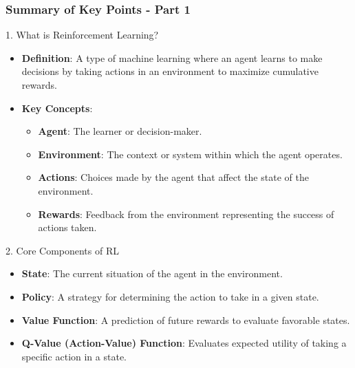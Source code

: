 \documentclass[aspectratio=169]{beamer}
\begin{document}
\begin{frame}[fragile]
    \frametitle{Summary of Key Points - Part 1}
    \begin{block}{1. What is Reinforcement Learning?}
        \begin{itemize}
            \item \textbf{Definition}: A type of machine learning where an agent learns to make decisions by taking actions in an environment to maximize cumulative rewards.
            \item \textbf{Key Concepts}:
            \begin{itemize}
                \item \textbf{Agent}: The learner or decision-maker.
                \item \textbf{Environment}: The context or system within which the agent operates.
                \item \textbf{Actions}: Choices made by the agent that affect the state of the environment.
                \item \textbf{Rewards}: Feedback from the environment representing the success of actions taken.
            \end{itemize}
        \end{itemize}
    \end{block}
    
    \begin{block}{2. Core Components of RL}
        \begin{itemize}
            \item \textbf{State}: The current situation of the agent in the environment.
            \item \textbf{Policy}: A strategy for determining the action to take in a given state.
            \item \textbf{Value Function}: A prediction of future rewards to evaluate favorable states.
            \item \textbf{Q-Value (Action-Value) Function}: Evaluates expected utility of taking a specific action in a state.
        \end{itemize}
    \end{block}
\end{frame}
\end{document}
